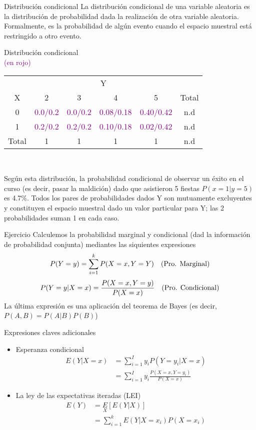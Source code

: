 {\small
	\begin{frame}{Distribución condicional}
		La distribución condicional de una variable aleatoria es la distribución de probabilidad dada la realización de otra variable aleatoria. Formalmente, es la probabilidad de algún evento cuando el espacio muestral está restringido a otro evento.\\
		\smallskip
		{\centering
			Distribución condicional\\
			\textcolor{purple}{(en rojo)}\\
			\smallskip
			\begin{tabular}{c|cccc|c} 
				& \multicolumn{4}{c|}{Y} & \\
				X & 2 & 3 & 4 & 5 & Total \\
				\hline
				0 & \textcolor{purple}{0.0/0.2} & \textcolor{purple}{0.0/0.2}& \textcolor{purple}{0.08/0.18} & \textcolor{purple}{0.40/0.42} & n.d \\
				1 & \textcolor{purple}{0.2/0.2}& \textcolor{purple}{0.2/0.2}& \textcolor{purple}{0.10/0.18} & \textcolor{purple}{0.02/0.42} & n.d \\
				\hline
				Total & 1 & 1 & 1 & 1 & n.d
			\end{tabular}\\}
		
		\medskip
		Según esta distribución, la probabilidad condicional de observar un éxito en el curso (es decir, pasar la maldición) dado que asistieron 5 fiestas $P (x = 1 | y = 5)$ es 4.7\%. Todos los pares de probabilidades dados Y son mutuamente excluyentes y constituyen el espacio muestral dado un valor particular para Y; las 2 probabilidades suman 1 en cada caso.
\end{frame}}
\begin{frame}{Ejercicio}
	Calculemos la probabilidad marginal y condicional (dad la información de probabilidad conjunta) mediantes las siquientes expresiones
	$$P(Y=y) = \sum_{i=1}^{k}P(X=x, Y=Y) \quad (\textup{Pro. Marginal})$$
	$$P(Y=y|X=x) = \frac{P(X=x,Y=y)}{P(X=x)} \quad (\textup{Pro. Condicional})$$
	La última expresión es una aplicación del teorema de Bayes (es decir,$ P (A, B) = P (A | B) P (B)$)
\end{frame}
\begin{frame}{Expresiones claves adicionales}
	\begin{itemize}
		\item Esperanza condicional
		\begin{align*}
			E(Y|X=x) &= \sum_{i=1}^{I} y_{i} P(Y=y_{i}|X=x)\\
			&= \sum_{i=1}^{I}y_{i}\frac{P(X=x,Y=y_{i})}{P(X=x)}
		\end{align*}
		\item La ley de las expectativas iteradas (LEI)
		\begin{align*}
			E(Y) &= \underset{X}{E}[E(Y|X)]\\
			&= \sum_{i=1}^{k}E(Y|X=x_{i})P(X=x_{i})
		\end{align*}
	\end{itemize}
\end{frame}
